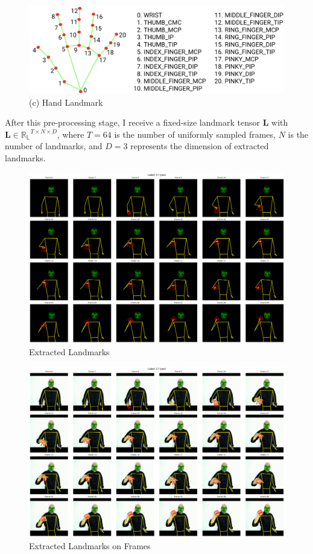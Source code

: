 \documentclass{article}
\begin{document}
\begin{figure}[H]
    \centering
    \includegraphics[width=1\linewidth]{Fig/hand-landmarks.png}
    \caption{(c) Hand Landmark}
    \label{fig:mediapipe2}
\end{figure}

After this pre-processing stage, I receive a fixed-size landmark tensor $\mathbf{L}$ with $\mathbf{L} \in \mathbb{R_L}^{T \times N \times D}$, where $T = 64$ is the number of uniformly sampled frames, $N$ is the number of landmarks, and $D = 3$ represents the dimension of extracted landmarks.

\begin{figure}[H]
    \centering
    \includegraphics[width=0.95\linewidth]{Fig/64-landmarks.png}
    \caption{Extracted Landmarks}
    \label{fig:landmark-draw}
\end{figure}

\begin{figure}[H]
    \centering
    \includegraphics[width=0.95\linewidth]{Fig/64-frame-landmarks.png}
    \caption{Extracted Landmarks on Frames}
    \label{fig:framelandmark}
\end{figure}
\end{document}
